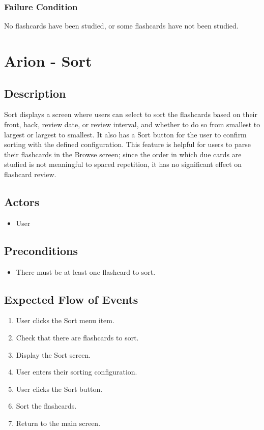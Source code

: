 \documentclass{scrreprt}
\begin{document}
    \subsection{Failure Condition}
    No flashcards have been studied, or some flashcards have not been studied.

\chapter{Arion - Sort}

\section{Description}
Sort displays a screen where users can select to sort the flashcards based on their
front, back, review date, or review interval, and whether to do so from smallest to largest or largest to smallest.
It also has a Sort button for the user to confirm sorting with the
defined configuration.
This feature is helpful for users to parse their flashcards in the Browse screen;
since the order in which due cards are studied is not meaningful to spaced repetition,
it has no significant effect on flashcard review.

\section{Actors}
\begin{itemize}
    \item User
\end{itemize}

\section{Preconditions}
\begin{itemize}
    \item There must be at least one flashcard to sort.
\end{itemize}

\section{Expected Flow of Events}
\begin{enumerate}[1.]
    \item User clicks the Sort menu item.
    \item Check that there are flashcards to sort.
    \item Display the Sort screen.
    \item User enters their sorting configuration.
    \item User clicks the Sort button.
    \item Sort the flashcards.
    \item Return to the main screen.
\end{enumerate}
\end{document}
